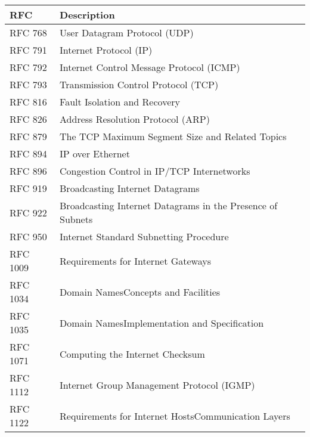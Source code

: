 
\begin{longtable}{ | l | p{15cm} | }
\hline
{\bf RFC} & 
{\bf Description} \\ \hline 

RFC 768 &
User Datagram Protocol (UDP) \\ \hline

RFC 791 &
Internet Protocol (IP) \\ \hline

RFC 792 &
Internet Control Message Protocol (ICMP) \\ \hline

RFC 793 &
Transmission Control Protocol (TCP) \\ \hline

RFC 816 &
Fault Isolation and Recovery \\ \hline

RFC 826 &
Address Resolution Protocol (ARP) \\ \hline

RFC 879 &
The TCP Maximum Segment Size and Related Topics \\ \hline

RFC 894 &
IP over Ethernet \\ \hline

RFC 896 &
Congestion Control in IP/TCP Internetworks \\ \hline

RFC 919 &
Broadcasting Internet Datagrams \\ \hline

RFC 922 &
Broadcasting Internet Datagrams in the Presence of Subnets \\ \hline

RFC 950 &
Internet Standard Subnetting Procedure \\ \hline

RFC 1009 &
Requirements for Internet Gateways \\ \hline

RFC 1034 &
Domain NamesConcepts and Facilities \\ \hline

RFC 1035 &
Domain NamesImplementation and Specification \\ \hline

RFC 1071 &
Computing the Internet Checksum \\ \hline

RFC 1112 &
Internet Group Management Protocol (IGMP) \\ \hline

RFC 1122 &
Requirements for Internet HostsCommunication Layers \\ \hline


\end{longtable}
